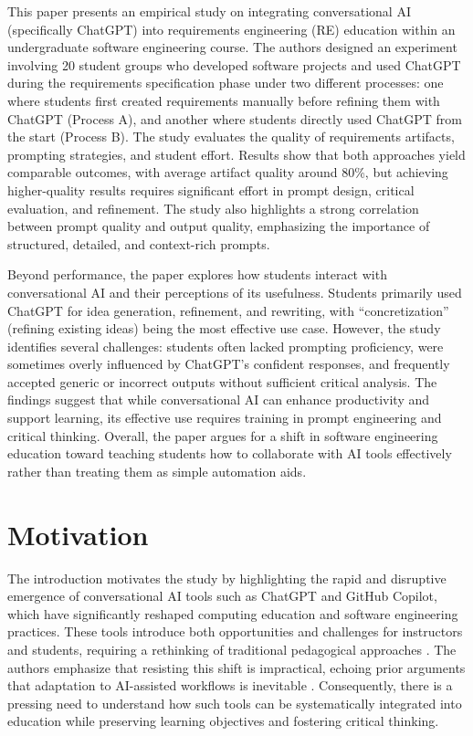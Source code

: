 This paper presents an empirical study on integrating conversational AI (specifically ChatGPT) into requirements engineering (RE) education within an undergraduate software engineering course. The authors designed an experiment involving 20 student groups who developed software projects and used ChatGPT during the requirements specification phase under two different processes: one where students first created requirements manually before refining them with ChatGPT (Process A), and another where students directly used ChatGPT from the start (Process B). The study evaluates the quality of requirements artifacts, prompting strategies, and student effort. Results show that both approaches yield comparable outcomes, with average artifact quality around 80\%, but achieving higher-quality results requires significant effort in prompt design, critical evaluation, and refinement. The study also highlights a strong correlation between prompt quality and output quality, emphasizing the importance of structured, detailed, and context-rich prompts.

Beyond performance, the paper explores how students interact with conversational AI and their perceptions of its usefulness. Students primarily used ChatGPT for idea generation, refinement, and rewriting, with “concretization” (refining existing ideas) being the most effective use case. However, the study identifies several challenges: students often lacked prompting proficiency, were sometimes overly influenced by ChatGPT's confident responses, and frequently accepted generic or incorrect outputs without sufficient critical analysis. The findings suggest that while conversational AI can enhance productivity and support learning, its effective use requires training in prompt engineering and critical thinking. Overall, the paper argues for a shift in software engineering education toward teaching students how to collaborate with AI tools effectively rather than treating them as simple automation aids.

\section{Motivation}
The introduction motivates the study by highlighting the rapid and disruptive emergence of conversational AI tools such as ChatGPT and GitHub Copilot, which have significantly reshaped computing education and software engineering practices. These tools introduce both opportunities and challenges for instructors and students, requiring a rethinking of traditional pedagogical approaches \cite{openai2023chatgpt,githubcopilot2021,denny2023prompt,becker2023ai,prather2023ai,kasneci2023chatgpt}. The authors emphasize that resisting this shift is impractical, echoing prior arguments that adaptation to AI-assisted workflows is inevitable \cite{kasneci2023chatgpt}. Consequently, there is a pressing need to understand how such tools can be systematically integrated into education while preserving learning objectives and fostering critical thinking.

